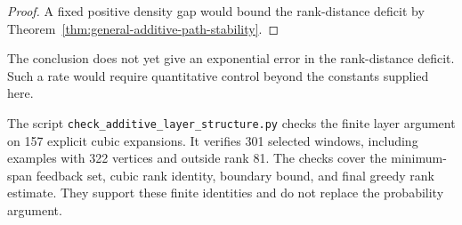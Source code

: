 \begin{proof}
A fixed positive density gap would bound the rank-distance deficit by Theorem~\ref{thm:general-additive-path-stability}.
\end{proof}

The conclusion does not yet give an exponential error in the rank-distance deficit.
Such a rate would require quantitative control beyond the constants supplied here.

The script \texttt{check\_additive\_layer\_structure.py} checks the finite layer argument on 157 explicit cubic expansions.
It verifies 301 selected windows, including examples with 322 vertices and outside rank 81.
The checks cover the minimum-span feedback set, cubic rank identity, boundary bound, and final greedy rank estimate.
They support these finite identities and do not replace the probability argument.
